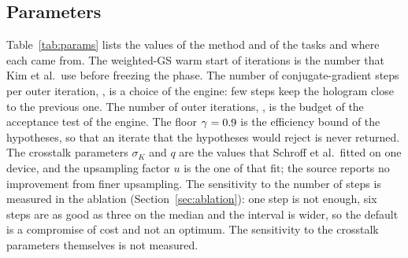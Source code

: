 \subsection{Parameters}\label{sec:parameters}

Table~\ref{tab:params} lists the values of the method and of the tasks and where each came from. The weighted-GS warm start of \parWarm{} iterations is the number that Kim et al.\ use before freezing the phase. The number of conjugate-gradient steps per outer iteration, \parCgSteps, is a choice of the engine: few steps keep the hologram close to the previous one. The number of outer iterations, \parOuter, is the budget of the acceptance test of the engine. The floor $\gamma=0.9$ is the efficiency bound of the hypotheses, so that an iterate that the hypotheses would reject is never returned.
The crosstalk parameters $\sigma_K$ and $q$ are the values that Schroff et al.\ fitted on one device, and the upsampling factor $u$ is the one of that fit; the source reports no improvement from finer upsampling. The sensitivity to the number of steps is measured in the ablation (Section~\ref{sec:ablation}): one step is not enough, six steps are as good as three on the median and the interval is wider, so the default is a compromise of cost and not an optimum. The sensitivity to the crosstalk parameters themselves is not measured.

